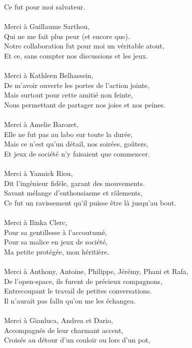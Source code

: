 \documentclass[english,a4paper,11pt,twoside]{StyleThese}
\begin{document}
Ce fut pour moi salvateur.\\
\\
Merci à Guillaume Sarthou,\\
Qui ne me fait plus peur (et encore que).\\
Notre collaboration fut pour moi un véritable atout,\\
Et ce, sans compter nos discussions et les jeux.\\
\\
Merci à Kathleen Belhassein,\\
De m'avoir ouverte les portes de l'action jointe,\\
Mais surtout pour cette amitié non feinte,\\
Nous permettant de partager nos joies et nos peines.\\
\\
Merci à Amelie Barozet,\\
Elle ne fut pas au labo sur toute la durée,\\
Mais ce n'est qu'un détail, nos soirées, goûters,\\
Et jeux de société n'y faisaient que commencer.\\
\\
Merci à Yannick Riou,\\
Dit l'ingénieur fidèle, garant des mouvements.\\
Savant mélange d'enthousiasme et râlements,\\
Ce fut un ravissement qu'il puisse être là jusqu'au bout.\\
\\
Merci à Ilinka Clerc,\\
Pour sa gentillesse à l'accoutumé,\\
Pour sa malice en jeux de société,\\
Ma petite protégée, mon héritière.\\
\\
Merci à Anthony, Antoine, Philippe, Jérémy, Phani et Rafa,\\
De l'open-space, ils furent de précieux compagnons,\\
Entrecoupant le travail de petites conversations.\\
Il n'aurait pas fallu qu'on me les échangea.\\
\\
Merci à Gianluca, Andrea et Dario,\\
Accompagnés de leur charmant accent,\\
Croisés au détour d'un couloir ou lors d'un pot,\\
\end{document}
